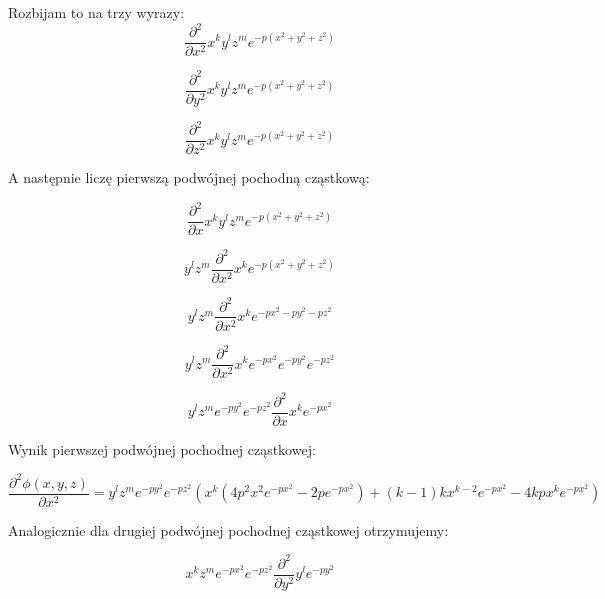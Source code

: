 Rozbijam to na trzy wyrazy:
\begin{equation}
	\frac{\partial^2}{\partial x^2} x^k y^l z^m e^{-p(x^2+y^2+z^2)}
\end{equation}

\begin{equation}
	\frac{\partial^2}{\partial y^2} x^k y^l z^m e^{-p(x^2+y^2+z^2)}
\end{equation}

\begin{equation}
	\frac{\partial^2}{\partial z^2} x^k y^l z^m e^{-p(x^2+y^2+z^2)}
\end{equation}

A następnie liczę pierwszą podwójnej pochodną cząstkową:

\begin{equation}
	\frac{\partial^2}{\partial x} x^k y^l z^m e^{-p(x^2+y^2+z^2)}
\end{equation}

\begin{equation}
	y^l z^m \frac{\partial^2}{\partial x^2} x^k e^{-p(x^2+y^2+z^2)}
\end{equation}

\begin{equation}
	y^l z^m \frac{\partial^2}{\partial x^2} x^k e^{-px^2-py^2-pz^2}
\end{equation}

\begin{equation}
	y^l z^m \frac{\partial^2}{\partial x^2} x^k e^{-px^2}e^{-py^2}e^{-pz^2}
\end{equation}

\begin{equation}
	y^l z^m e^{-py^2}e^{-pz^2} \frac{\partial^2}{\partial x} x^k e^{-px^2}
\end{equation}

Wynik pierwszej podwójnej pochodnej cząstkowej:

\begin{equation}
	\frac{\partial^2\phi(x,y,z)}{\partial x^2} = y^l z^m e^{-py^2}e^{-pz^2}  \left(x^k (4 p^2 x^2 e^{-p x^2}-2 p e^{-p x^2})+(k-1) k x^{k-2} e^{-p x^2}-4 k p x^k e^{-p x^2}\right)
\end{equation}

Analogicznie dla drugiej podwójnej pochodnej cząstkowej otrzymujemy:

\begin{equation}
	x^k z^m e^{-px^2}e^{-pz^2} \frac{\partial^2}{\partial y^2} y^l e^{-py^2}
\end{equation}

